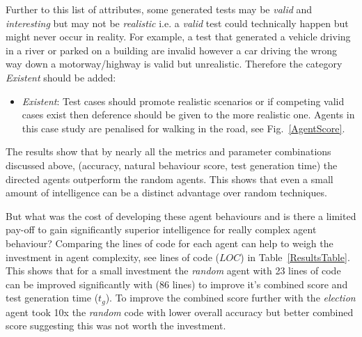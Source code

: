 \documentclass[letterpaper, 10 pt, journal, twoside]{IEEEtran}
\begin{document}

Further to this list of attributes, some generated tests may be \textit{valid} and \textit{interesting} but may not be \textit{realistic} i.e. a \textit{valid} test could technically happen but might never occur in reality. For example, a test that generated a vehicle driving in a river or parked on a building are invalid however a car driving the wrong way down a motorway/highway is valid but unrealistic. %
Therefore the category \textit{Existent} should be added:
\begin{itemize}
	\item \textit{Existent}: Test cases should promote realistic scenarios or if competing valid cases exist then deference should be given to the more realistic one. Agents in this case study are penalised for walking in the road, see Fig.~\ref{AgentScore}.
\end{itemize}


The results show that by nearly all the metrics and parameter combinations discussed above, (accuracy, natural behaviour score, test generation time) the directed agents outperform the random agents. This shows that even a small amount of intelligence can be a distinct advantage over random techniques. 
%

But what was the cost of developing these agent behaviours and is there a limited pay-off to gain significantly superior intelligence for really complex agent behaviour? %
%
Comparing the lines of code for each agent can help to weigh the investment in agent complexity, see lines of code ($LOC$) in Table~\ref{ResultsTable}. This shows that for a small investment the \textit{random} agent with 23 lines of code can be improved significantly with (86 lines) to improve it's combined score and test generation time ($t_{g}$). To improve the combined score further with the \textit{election} agent took 10x the \textit{random} code with lower overall accuracy but better combined score suggesting this was not worth the investment.
\end{document}
